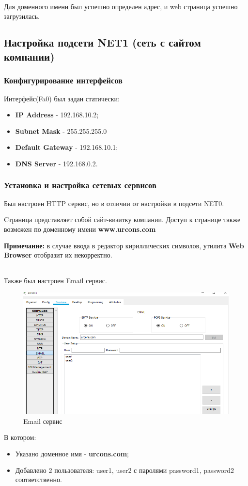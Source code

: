 \documentclass[14pt,a4paper,report]{report}
\begin{document}
Для доменного имени был успешно определен адрес, и web страница успешно загрузилась.


\subsection{Настройка подсети NET1 (сеть с сайтом компании)}
\subsubsection{Конфигурирование интерфейсов}
Интерфейс(Fa0) был задан статически:
\begin{itemize}
\item \textbf{IP Address} - 192.168.10.2;
\item \textbf{Subnet Mask} - 255.255.255.0
\item \textbf{Default Gateway} - 192.168.10.1;
\item \textbf{DNS Server} - 192.168.0.2.
\end{itemize}
\subsubsection{Установка и настройка сетевых сервисов}
Был настроен HTTP сервис, но в отличии от настройки в подсети NET0.

Cтраница представляет собой сайт-визитку компании. Доступ к странице также возможен по доменному имени \textbf{www.urcons.com}

\textbf{Примечание:} в случае ввода в редактор кириллических символов, утилита \textbf{Web Browser} отобразит их некорректно.\\\\

\clearpage

Также был настроен Email сервис.
\begin{figure}[h]
  \centering
  \includegraphics[width=.8\textwidth]{img/4}
  \caption{Email сервис}
\end{figure}
В котором:
\begin{itemize}
\item Указано доменное имя - \textbf{urcons.com};
\item Добавлено 2 пользователя: user1, user2 с паролями password1, password2 соответственно.
\end{itemize}
\end{document}
